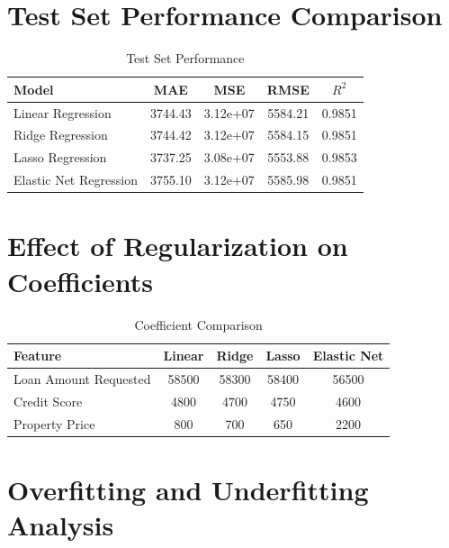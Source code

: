 \documentclass[11pt]{article}
\begin{document}
\section*{Test Set Performance Comparison}
\begin{table}[H]
\centering
\renewcommand{\arraystretch}{1.3}
\caption{Test Set Performance}
\begin{tabular}{|l|c|c|c|c|}
\hline
Model & MAE & MSE & RMSE & $R^2$ \\ \hline
Linear Regression & 3744.43 & 3.12e+07 & 5584.21 & 0.9851 \\
Ridge Regression & 3744.42 & 3.12e+07 & 5584.15 & 0.9851 \\
Lasso Regression & 3737.25 & 3.08e+07 & 5553.88 & 0.9853 \\
Elastic Net Regression & 3755.10 & 3.12e+07 & 5585.98 & 0.9851 \\ \hline
\end{tabular}
\end{table}

\section{Effect of Regularization on Coefficients}
\begin{table}[H]
\centering
\renewcommand{\arraystretch}{1.3}
\caption{Coefficient Comparison}
\begin{tabular}{|l|c|c|c|c|}
\hline
Feature & Linear & Ridge & Lasso & Elastic Net \\ \hline
Loan Amount Requested & 58500 & 58300 & 58400 & 56500 \\
Credit Score          & 4800  & 4700  & 4750  & 4600  \\
Property Price        & 800   & 700   & 650   & 2200  \\ \hline
\end{tabular}
\end{table}

\section{Overfitting and Underfitting Analysis}
\end{document}
